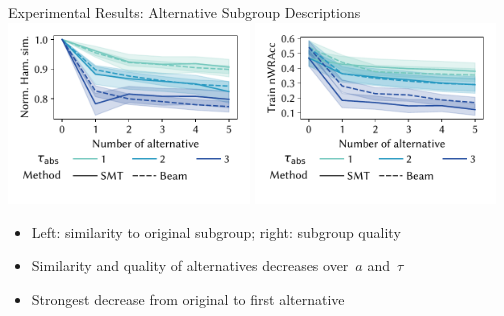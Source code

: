 \documentclass[USenglish]{article} %
\begin{document}
\begin{minipage}[t]{0.49\textwidth}
\begin{standardbox}{Experimental Results: Alternative Subgroup Descriptions}
		\centering
		\includegraphics[width=0.48\textwidth, trim=10 25 10 10, clip]{plots/csd-alternatives-hamming.pdf}
		\hfill
		\includegraphics[width=0.48\textwidth, trim=10 25 10 10, clip]{plots/csd-alternatives-train-nwracc.pdf}
		\begin{itemize}
			\item Left: similarity to original subgroup; right: subgroup quality
			\item Similarity and quality of alternatives decreases over~$a$ and~$\tau$
			\item Strongest decrease from original to first alternative
		\end{itemize}
	\end{standardbox}
\end{minipage}
\end{document}
